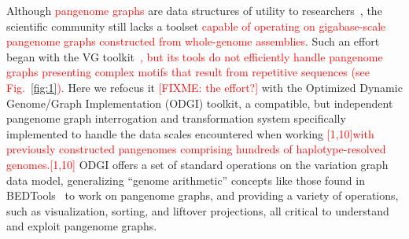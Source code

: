 \documentclass{bioinfo}
\newcommand{\red}[1]{{\textcolor{Red}{#1}}}
\newcommand{\FIXME}[1]{\red{[FIXME: #1]}}
\newcommand{\REVIEWED}[1]{{\textcolor{Red}{#1}}}
\begin{document}
Although \REVIEWED{pangenome graphs} are data structures of utility to researchers~\citep{cpang2018,Garrison:2018,Baaijens_2019,Hickey:2020,Sibbesen_2021}, the scientific community still lacks a toolset \REVIEWED{capable of operating on gigabase-scale pangenome graphs constructed from whole-genome assemblies}.
Such an effort began with the VG toolkit~\citep{Garrison:2018}\REVIEWED{, but its tools do not efficiently handle pangenome graphs presenting complex motifs that result from repetitive sequences (see Fig.~\ref{fig:1}).}
Here we refocus it \FIXME{the effort?} with the Optimized Dynamic Genome/Graph Implementation (ODGI) toolkit, a compatible, but independent pangenome graph interrogation and transformation system specifically implemented to handle the data scales encountered when working \REVIEWED{[1,10]with previously constructed pangenomes comprising hundreds of haplotype-resolved genomes.[1,10]}
ODGI offers a set of standard operations on the variation graph data model, generalizing ``genome arithmetic'' concepts like those found in BEDTools~\citep{Quinlan_2010} to work on pangenome graphs,
and providing a variety of operations, such as visualization, sorting, and liftover projections, all critical to understand and exploit pangenome graphs.


\end{document}
